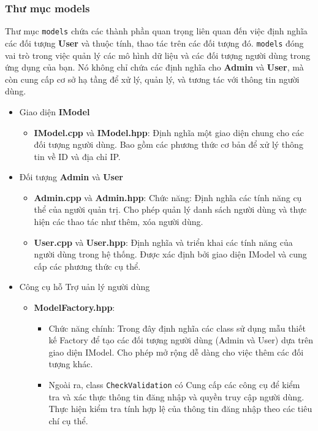 \subsubsection{Thư mục models}
Thư mục \verb|models| chứa các thành phần quan trọng liên quan đến việc định nghĩa các đối tượng \textbf{User} và thuộc tính, thao tác trên các đối tượng đó. \verb|models| đóng vai trò trong việc quản lý các  mô hình dữ liệu và các đối tượng người dùng trong ứng dụng của bạn. Nó không chỉ chứa các định nghĩa cho \textbf{Admin} và \textbf{User}, mà còn cung cấp cơ sở hạ tầng để xử lý, quản lý, và tương tác với thông tin người dùng.
\begin{itemize}
	\item Giao diện \textbf{IModel}
	\begin{itemize}
		\item \textbf{IModel.cpp} và \textbf{IModel.hpp}: Định nghĩa một giao diện chung cho các đối tượng người dùng. Bao gồm các phương thức cơ bản để xử lý thông tin về ID và địa chỉ IP.
	\end{itemize}
	\item Đối tượng \textbf{Admin} và \textbf{User}
	\begin{itemize}
		\item \textbf{Admin.cpp} và \textbf{Admin.hpp}:  Chức năng: Định nghĩa các tính năng cụ thể của người quản trị. Cho phép quản lý danh sách người dùng và thực hiện các thao tác như thêm, xóa người dùng.
		\item \textbf{User.cpp} và \textbf{User.hpp}: Định nghĩa và triển khai các tính năng của người dùng trong hệ thống. Được xác định bởi giao diện IModel và cung cấp các phương thức cụ thể.
	\end{itemize}
	\item Công cụ hỗ Trợ uản lý người dùng
	\begin{itemize}
		\item \textbf{ModelFactory.hpp}: 
		\begin{itemize}
			\item Chức năng chính: Trong đây định nghĩa các class sử dụng mẫu thiết kế Factory để tạo các đối tượng người dùng (Admin và User) dựa trên giao diện IModel. Cho phép mở rộng dễ dàng cho việc thêm các đối tượng khác.
			\item Ngoài ra, class \verb|CheckValidation| có Cung cấp các công cụ để kiểm tra và xác thực thông tin đăng nhập và quyền truy cập người dùng. Thực hiện kiểm tra tính hợp lệ của thông tin đăng nhập theo các tiêu chí cụ thể. 
		\end{itemize} 
	\end{itemize}
\end{itemize}

